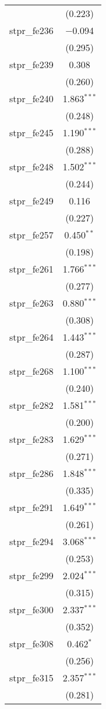 \begin{table}[!htbp]
\begin{tabular}{@{\extracolsep{5pt}}lc}
  & (0.223) \\ 
  stpr\_fe236 & $-$0.094 \\ 
  & (0.295) \\ 
  stpr\_fe239 & 0.308 \\ 
  & (0.260) \\ 
  stpr\_fe240 & 1.863$^{***}$ \\ 
  & (0.248) \\ 
  stpr\_fe245 & 1.190$^{***}$ \\ 
  & (0.288) \\ 
  stpr\_fe248 & 1.502$^{***}$ \\ 
  & (0.244) \\ 
  stpr\_fe249 & 0.116 \\ 
  & (0.227) \\ 
  stpr\_fe257 & 0.450$^{**}$ \\ 
  & (0.198) \\ 
  stpr\_fe261 & 1.766$^{***}$ \\ 
  & (0.277) \\ 
  stpr\_fe263 & 0.880$^{***}$ \\ 
  & (0.308) \\ 
  stpr\_fe264 & 1.443$^{***}$ \\ 
  & (0.287) \\ 
  stpr\_fe268 & 1.100$^{***}$ \\ 
  & (0.240) \\ 
  stpr\_fe282 & 1.581$^{***}$ \\ 
  & (0.200) \\ 
  stpr\_fe283 & 1.629$^{***}$ \\ 
  & (0.271) \\ 
  stpr\_fe286 & 1.848$^{***}$ \\ 
  & (0.335) \\ 
  stpr\_fe291 & 1.649$^{***}$ \\ 
  & (0.261) \\ 
  stpr\_fe294 & 3.068$^{***}$ \\ 
  & (0.253) \\ 
  stpr\_fe299 & 2.024$^{***}$ \\ 
  & (0.315) \\ 
  stpr\_fe300 & 2.337$^{***}$ \\ 
  & (0.352) \\ 
  stpr\_fe308 & 0.462$^{*}$ \\ 
  & (0.256) \\ 
  stpr\_fe315 & 2.357$^{***}$ \\ 
  & (0.281) \\ 

\end{tabular}
\end{table}
